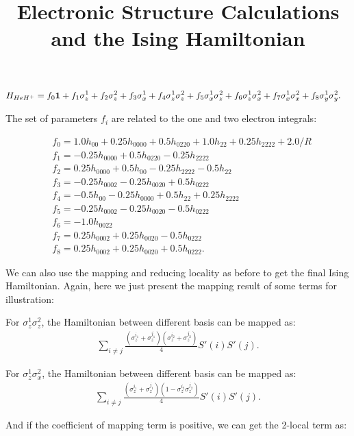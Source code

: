 \documentclass{article}
\newcommand\x[1]{\sigma_x^{#1}}
\newcommand\y[1]{\sigma_y^{#1}}
\newcommand\z[1]{\sigma_z^{#1}}\title{Electronic Structure Calculations and the Ising Hamiltonian}
\begin{document}
\begin{equation}
\begin{aligned}
&H_{HeH^+}=f_0{\bf 1}+f_1\z{1}+f_2\z{2}+f_3\x{1}+f_4\z{1}\z{2}+f_5\x{1}\z{2}+f_6\z{1}\x{2}+f_7\x{1}\x{2}+f_8\y{1}\y{2} .
\end{aligned}
\end{equation}

The set of parameters ${f_i}$ are related to the one and two electron integrals:

\begin{equation}
\begin{aligned}
&f_0=1.0h_{00} + 0.25h_{0000} + 0.5h_{0220} + 1.0h_{22} + 0.25h_{2222} + 2.0/R\\
&f_1=-0.25h_{0000 }+ 0.5h_{0220 }- 0.25h_{2222}\\
&f_2=0.25h_{0000 }+ 0.5h_{00 }- 0.25h_{2222 }- 0.5h_{22}\\
&f_3=-0.25h_{0002 }- 0.25h_{0020 }+ 0.5h_{0222}\\
&f_4=-0.5h_{00 }- 0.25h_{0000 }+ 0.5h_{22 }+ 0.25h_{2222}\\
&f_5=-0.25h_{0002 }- 0.25h_{0020 }- 0.5h_{0222}\\
&f_6=-1.0h_{0022}\\
&f_7=0.25h_{0002 }+ 0.25h_{0020 }- 0.5h_{0222}\\
&f_8=0.25h_{0002 }+ 0.25h_{0020 }+ 0.5h_{0222} .
\end{aligned}
\end{equation}


We can also use the mapping and reducing locality as before to get the final Ising Hamiltonian. Again, here we just present the mapping result of some terms for illustration:

For $\z{1}\z{2}$, the Hamiltonian between different basis can be mapped as:
\begin{equation}
\begin{aligned}
\sum_{i \neq j}\frac{(\z{i_1}+\z{j_1})(\z{i_2}+\z{j_2})}{4}S'(i)S'(j) .
\end{aligned}
\end{equation}

For $\z{1}\x{2}$, the Hamiltonian between different basis can be mapped as:
\begin{equation}
\begin{aligned}
\sum_{i \neq j}\frac{(\z{i_1}+\z{j_1})(1-\z{i_2}\z{j_2})}{4}S'(i)S'(j) .
\end{aligned}
\end{equation}

And if the coefficient of mapping term is positive, we can get the 2-local term as:
\end{document}
